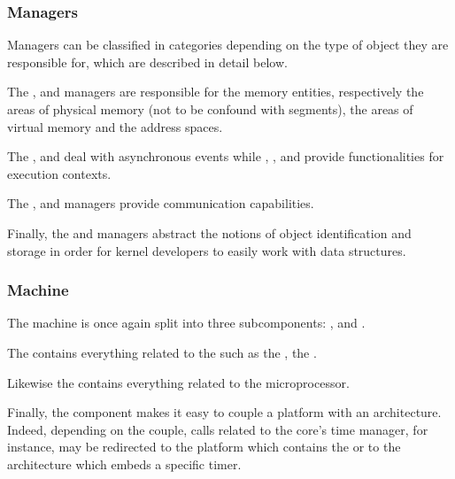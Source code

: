 \begin{frame}
  \frametitle{Managers}

  Managers can be classified in categories depending on the type of object
  they are responsible for, which are described in detail below.

  \-

  The ,  and  managers are responsible for
  the memory entities, respectively the areas of physical memory (not to be
  confound with  segments), the areas of virtual memory and
  the address spaces.

  \-

  The ,  and  deal with asynchronous events
  while , ,  and  provide
  functionalities for execution contexts.


  \-

  The ,  and  managers
  provide communication capabilities.

  \-

  Finally, the  and  managers abstract the notions of
  object identification and storage in order for kernel developers to easily
  work with data structures.
\end{frame}


\begin{frame}
  \frametitle{Machine}

  The machine is once again split into three subcomponents: ,
   and .

  \-

  The  contains everything related to the  such as the ,
  the  \etc{}.

  \-

  Likewise the  contains everything related to the
  microprocessor.

  \-

  Finally, the  component makes it easy to couple a platform with
  an architecture. Indeed, depending on the couple, calls related to the
  core's time manager, for instance, may be redirected to the platform
  which contains the  or to the architecture which embeds a
  specific timer.
\end{frame}

